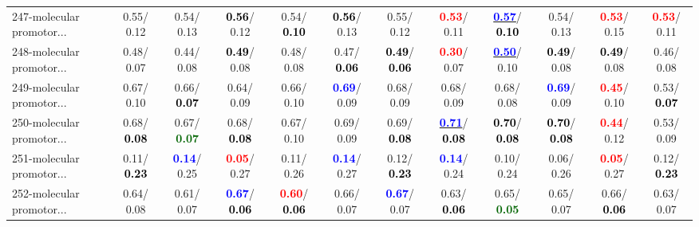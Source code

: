 \begin{table}[h]
\begin{center}
{\begin{tabular}{lc|c|c|c|c|c|c|c|c|c|c}
247-molecular promotor... &   0.55/  0.12 &   0.54/  0.13 & \textcolor{black}{\textbf{  0.56}}/  0.12 &   0.54/\textcolor{black}{\textbf{  0.10}} & \textcolor{black}{\textbf{  0.56}}/  0.13 &   0.55/  0.12 & \textcolor{red}{\textbf{  0.53}}/  0.11 & \underline{\textcolor{blue}{\textbf{  0.57}}}/\textcolor{black}{\textbf{  0.10}} &   0.54/  0.13 & \textcolor{red}{\textbf{  0.53}}/  0.15 & \textcolor{red}{\textbf{  0.53}}/  0.11 \\
248-molecular promotor... &   0.48/  0.07 &   0.44/  0.08 & \textcolor{black}{\textbf{  0.49}}/  0.08 &   0.48/  0.08 &   0.47/\textcolor{black}{\textbf{  0.06}} & \textcolor{black}{\textbf{  0.49}}/\textcolor{black}{\textbf{  0.06}} & \textcolor{red}{\textbf{  0.30}}/  0.07 & \underline{\textcolor{blue}{\textbf{  0.50}}}/  0.10 & \textcolor{black}{\textbf{  0.49}}/  0.08 & \textcolor{black}{\textbf{  0.49}}/  0.08 &   0.46/  0.08 \\
249-molecular promotor... &   0.67/  0.10 &   0.66/\textcolor{black}{\textbf{  0.07}} &   0.64/  0.09 &   0.66/  0.10 & \textcolor{blue}{\textbf{  0.69}}/  0.09 &   0.68/  0.09 &   0.68/  0.09 &   0.68/  0.08 & \textcolor{blue}{\textbf{  0.69}}/  0.09 & \textcolor{red}{\textbf{  0.45}}/  0.10 &   0.53/\textcolor{black}{\textbf{  0.07}} \\
250-molecular promotor... &   0.68/\textcolor{black}{\textbf{  0.08}} &   0.67/\textcolor{darkgreen}{\textbf{  0.07}} &   0.68/\textcolor{black}{\textbf{  0.08}} &   0.67/  0.10 &   0.69/  0.09 &   0.69/\textcolor{black}{\textbf{  0.08}} & \underline{\textcolor{blue}{\textbf{  0.71}}}/\textcolor{black}{\textbf{  0.08}} & \textcolor{black}{\textbf{  0.70}}/\textcolor{black}{\textbf{  0.08}} & \textcolor{black}{\textbf{  0.70}}/\textcolor{black}{\textbf{  0.08}} & \textcolor{red}{\textbf{  0.44}}/  0.12 &   0.53/  0.09 \\
251-molecular promotor... &   0.11/\textcolor{black}{\textbf{  0.23}} & \textcolor{blue}{\textbf{  0.14}}/  0.25 & \textcolor{red}{\textbf{  0.05}}/  0.27 &   0.11/  0.26 & \textcolor{blue}{\textbf{  0.14}}/  0.27 &   0.12/\textcolor{black}{\textbf{  0.23}} & \textcolor{blue}{\textbf{  0.14}}/  0.24 &   0.10/  0.24 &   0.06/  0.26 & \textcolor{red}{\textbf{  0.05}}/  0.27 &   0.12/\textcolor{black}{\textbf{  0.23}} \\
252-molecular promotor... &   0.64/  0.08 &   0.61/  0.07 & \textcolor{blue}{\textbf{  0.67}}/\textcolor{black}{\textbf{  0.06}} & \textcolor{red}{\textbf{  0.60}}/\textcolor{black}{\textbf{  0.06}} &   0.66/  0.07 & \textcolor{blue}{\textbf{  0.67}}/  0.07 &   0.63/\textcolor{black}{\textbf{  0.06}} &   0.65/\textcolor{darkgreen}{\textbf{  0.05}} &   0.65/  0.07 &   0.66/\textcolor{black}{\textbf{  0.06}} &   0.63/  0.07 \\ \hline

\end{tabular}}
\end{center}
\end{table}
